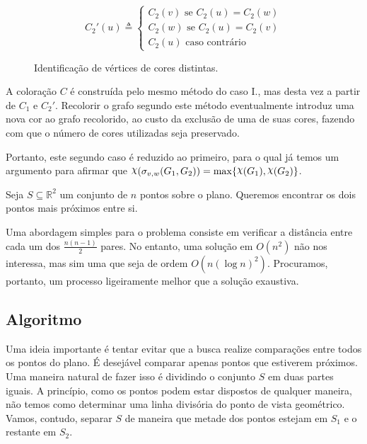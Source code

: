 \documentclass{homework}
\begin{document}
\begin{enumerate}[label=\Roman*.]
		$$C_2'(u) \triangleq \begin{cases}
		C_2(v) \text{ se } C_2(u) = C_2(w)\\
		C_2(w) \text{ se } C_2(u) = C_2(v)\\
		C_2(u) \text{ caso contrário}
		\end{cases}$$
		
		\begin{figure}[H]
			\centering
			
			\caption{Identificação de vértices de cores distintas.}
			\label{fig:2.3}
		\end{figure}
		
		A coloração $C$ é construída pelo mesmo método do caso {I.}, mas desta vez a partir de $C_1$ e $C_2'$. Recolorir o grafo segundo este método eventualmente introduz uma nova cor ao grafo recolorido, ao custo da exclusão de uma de suas cores, fazendo com que o número de cores utilizadas seja preservado.\par
		
		Portanto, este segundo caso é reduzido ao primeiro, para o qual já temos um argumento para afirmar que $\rchi(\sigma_{v, w}(G_1, G_2)) = \max \{\rchi(G_1), \rchi(G_2)\}$. \par
		
	\end{enumerate}
	
	\quest Seja $S \subseteq \mathbb{R}^2$ um conjunto de $n$ pontos sobre o plano. Queremos encontrar os dois pontos mais próximos entre si. \par
	
	Uma abordagem simples para o problema consiste em verificar a distância entre cada um dos $\frac{n (n - 1)}{2}$ pares. No entanto, uma solução em $O(n^2)$ não nos interessa, mas sim uma que seja de ordem $O(n (\log n)^2)$. Procuramos, portanto, um processo ligeiramente melhor que a solução exaustiva. \par
	
	\subsection*{Algoritmo}
	
	Uma ideia importante é tentar evitar que a busca realize comparações entre todos os pontos do plano. É desejável comparar apenas pontos que estiverem próximos. Uma maneira natural de fazer isso é dividindo o conjunto $S$ em duas partes iguais\cite{weerdt:16}. A princípio, como os pontos podem estar dispostos de qualquer maneira, não temos como determinar uma linha divisória do ponto de vista geométrico. Vamos, contudo, separar $S$ de maneira que metade dos pontos estejam em $S_1$ e o restante em $S_2$. \par
	
\end{document}
